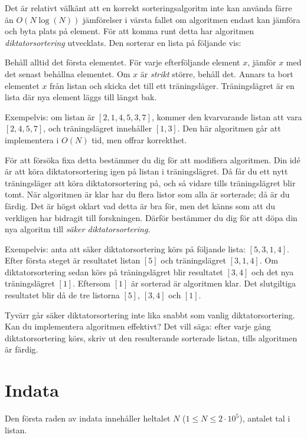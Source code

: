
Det är relativt välkänt att en korrekt sorteringsalgoritm inte kan använda färre än $O(N\log(N))$ jämförelser
i värsta fallet om algoritmen endast kan jämföra och byta plats på element.
För att komma runt detta har algoritmen \textit{diktatorsortering} utvecklats.
Den sorterar en lista på följande vis:

Behåll alltid det första elementet.
För varje efterföljande element $x$, jämför $x$ med det senast behållna elementet.
Om $x$ är \emph{strikt} större, behåll det.
Annars ta bort elementet $x$ från listan och skicka det till ett träningsläger.
Träningslägret är en lista där nya element läggs till längst bak.

Exempelvis: om listan är $[2,1,4,5,3,7]$, kommer den kvarvarande listan att vara $[2,4,5,7]$,
och träningslägret innehåller $[1,3]$.
Den här algoritmen går att implementera i $O(N)$ tid, men offrar korrekthet.

För att försöka fixa detta bestämmer du dig för att modifiera algoritmen.
Din idé är att köra diktatorsortering igen på listan i träningslägret.
Då får du ett nytt träningsläger att köra diktatorsortering på, och så vidare tills träningslägret blir tomt.
När algoritmen är klar har du flera listor som alla är sorterade; då är du färdig.
Det är högst oklart vad detta är bra för, men det känns som att du verkligen har bidragit till forskningen.
Därför bestämmer du dig för att döpa din nya algoritm till \textit{säker diktatorsortering}.

Exempelvis: anta att säker diktatorsortering körs på följande lista: $[5,3,1,4]$.
Efter första steget är resultatet listan $[5]$ och träningslägret $[3,1,4]$.
Om diktatorsortering sedan körs på träningslägret blir resultatet $[3,4]$ och det nya träningslägret $[1]$.
Eftersom $[1]$ är sorterad är algoritmen klar.
Det slutgiltiga resultatet blir då de tre listorna $[5]$, $[3,4]$ och $[1]$.

Tyvärr går säker diktatorsortering inte lika snabbt som vanlig diktatorsortering.
Kan du implementera algoritmen effektivt?
Det vill säga: efter varje gång diktatorsortering körs, skriv ut den resulterande sorterade listan,
tills algoritmen är färdig.


\section*{Indata}
Den första raden av indata innehåller heltalet $N$ ($1 \leq N \leq 2 \cdot 10^5$),
antalet tal i listan.

